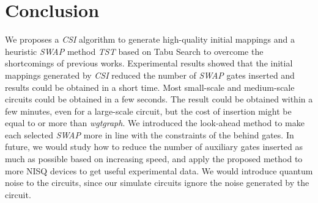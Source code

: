 \documentclass[runningheads]{llncs}
\begin{document}
\section{Conclusion}
\label{Conclusion}
We proposes a \textit{CSI} algorithm to generate high-quality initial mappings and a heuristic \textit{SWAP} method \textit{TST} based on Tabu Search to overcome the shortcomings of previous works.
Experimental results showed that
the initial mappings generated by \textit{CSI} reduced the number of \textit{SWAP} gates inserted
and results could be obtained in a short time.
Most small-scale and medium-scale circuits could be obtained in a few seconds.
The result could be obtained within a few minutes, even for a large-scale circuit,
but the cost of insertion might be equal to or more than \textit{wgtgraph}.
We introduced the look-ahead method to make each selected \textit{SWAP} more in line with the constraints of the behind gates.
In future, we would study how to reduce the number of auxiliary gates inserted as much as possible based on increasing speed,
and apply the proposed method to more NISQ devices to get useful experimental data.
We would introduce quantum noise to the circuits, since our simulate circuits ignore the noise generated by the circuit.



\newpage
\appendix
\end{document}
